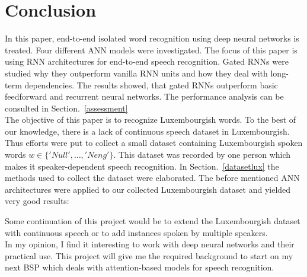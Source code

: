 
\section{Conclusion}

In this paper, end-to-end isolated word recognition using deep neural networks
is treated. Four different ANN models were investigated. The focus of this paper
is using RNN architectures for end-to-end speech recognition. Gated RNNs were
studied why they outperform vanilla RNN units and how they deal with long-term
dependencies. The results showed, that gated RNNs outperform basic feedforward
and recurrent neural networks. The performance analysis can be consulted in
Section.~\ref{assessment}\\

The objective of this paper is to recognize Luxembourgish words. To the best of
our knowledge, there is a lack of continuous speech dataset in Luxembourgish.
Thus efforts were put to collect a small dataset containing Luxembourgish spoken
words $w \in \{'Null',\dots,'Neng'\}$. This dataset was recorded by one person
which makes it speaker-dependent speech recognition. In
Section.~\ref{datasetlux} the methods used to collect the dataset were
elaborated. The before mentioned ANN architectures were applied to our collected
Luxembourgish dataset and yielded very good results: 

\begin{table}[H]
    \centering
\end{table}

Some continuation of this project would be to extend the Luxembourgish dataset
with continuous speech or to add instances spoken by multiple speakers.\\

In my opinion, I find it interesting to work with deep neural networks
and their practical use. This project will give me the required background to
start on my next BSP which deals with attention-based models for speech
recognition.
